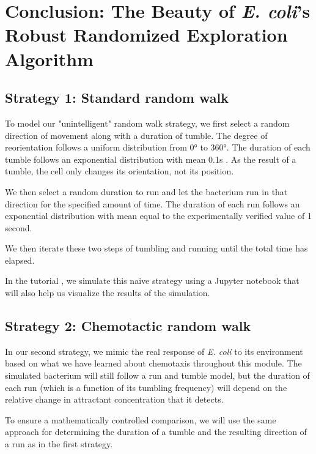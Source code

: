 \FloatBarrier
{}

\section{Conclusion: The Beauty of \textit{E. coli}'s Robust Randomized Exploration Algorithm}
\label{sec:conclusion}

\subsection{Strategy 1: Standard random walk}

To model our "unintelligent" random walk strategy, we first select a random direction of movement along with a duration of tumble. The degree of reorientation follows a uniform distribution from 0° to 360°. The duration of each tumble follows an exponential distribution with mean 0.1s \citep{Saragosti_2012}. As the result of a tumble, the cell only changes its orientation, not its position.

We then select a random duration to run and let the bacterium run in that direction for the specified amount of time. The duration of each run follows an exponential distribution with mean equal to the experimentally verified value of 1 second.

We then iterate these two steps of tumbling and running until the total time has elapsed.

In the tutorial , we simulate this naive strategy using a Jupyter notebook that will also help us visualize the results of the simulation.

\FloatBarrier
{}
{}
\subsection{Strategy 2: Chemotactic random walk}


In our second strategy, we mimic the real response of \textit{E. coli} to its environment based on what we have learned about chemotaxis throughout this module. The simulated bacterium will still follow a run and tumble model, but the duration of each run (which is a function of its tumbling frequency) will depend on the relative change in attractant concentration that it detects.

To ensure a mathematically controlled comparison, we will use the same approach for determining the duration of a tumble and the resulting direction of a run as in the first strategy.

